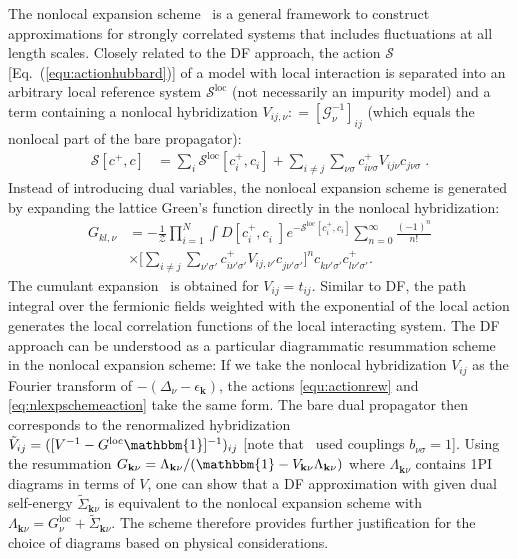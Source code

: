 \documentclass[rmp,aps,reprint,amsmath,amssymb,superscriptaddress,showpacs,nofootinbib]{revtex4-1}
\newcommand\Let{\mathrel{\mathop:\!\!=}}
\newcommand{\gr}[1] {\textcolor{green}{GR: #1}}
\begin{document}
The nonlocal expansion scheme~\cite{Li2015}  is a general framework to construct approximations for strongly correlated systems that includes fluctuations at all length scales. Closely related to the DF approach, the action $\mathcal{S}$ [Eq.~(\ref{equ:actionhubbard})] of a model with local interaction  is separated into an arbitrary local reference system $\mathcal{S}^{\text{loc}}$ (not necessarily an impurity model) and a term containing a nonlocal hybridization $V_{ij,\nu}\Let [\mathcal{G}^{-1}_{\nu}]_{ij}$ (which equals the nonlocal part of the bare propagator):
\begin{align}
  \mathcal{S}[c^{+},c]
  &= \sum_{i}\mathcal{S}^{\text{loc}}[c^{+}_{i},c_{i}]+\sum_{i\neq j}\sum_{\nu\sigma}c_{i\nu\sigma}^{+}V_{ij\nu}c_{j\nu\sigma}
  \label{eq:nlexpschemeaction} \; .
\end{align}
Instead of introducing dual variables, the nonlocal expansion scheme is generated by expanding the lattice Green's function directly in the nonlocal hybridization:
\begin{align}
  G_{kl,\nu}&=-\frac{1}{\mathcal{Z}}\prod_{i=1}^{N}\int D[c_{i}^{+},c^{\phantom +}_{i}]e^{-\mathcal{S}^{\text{loc}}[c_{i}^{+},c_{i}]} \sum_{n=0}^{\infty}\frac{(-1)^{n}}{n!}\nonumber \\ &\times\Big[\sum_{i\neq j}\sum_{\nu'\sigma'}c_{i\nu'\sigma'}^{+}V_{ij,\nu'}c^{\phantom +}_{j\nu'\sigma'}\Big]^n c_{k\nu'\sigma'}^{\phantom +}c_{l\nu'\sigma'}^{+}.
\end{align}
The cumulant expansion~\cite{Sarker1988,Metzner1991} is obtained for $V_{ij}=t_{ij}$. Similar to DF, the path integral over the fermionic fields weighted with the exponential of the local action generates the local correlation functions of the local interacting system. The DF approach can be understood as a particular diagrammatic resummation scheme in the nonlocal expansion scheme: If we take the nonlocal hybridization  $V_{ij}$ as the  Fourier transform of $-(\Delta_{\nu}-\epsilon_{\mathbf{k}})$, the actions \eqref{equ:actionrew} and \eqref{eq:nlexpschemeaction} take the same form. The bare dual propagator then corresponds to the renormalized hybridization $\tilde{V}_{ij}=([V^{-1}-G^{\text{loc}}\mathbbm{1}]^{-1})_{ij}$ [note that~ used couplings $b_{\nu\sigma}=1$]. Using the resummation $G_{\mathbf{k}\nu}=\Lambda_{\mathbf{k}\nu}/(\mathbbm{1}-V_{\mathbf{k}\nu}\Lambda_{\mathbf{k}\nu})$ where $\Lambda_{\mathbf{k}\nu}$ contains 1PI diagrams in terms of $V$, one can show that a DF approximation with given dual self-energy $\tilde{\Sigma}_{\mathbf{k}\nu}$ is equivalent to the nonlocal expansion scheme with $\Lambda_{\mathbf{k}\nu}=G^\text{loc}_\nu+\tilde{\Sigma}_{\mathbf{k}\nu}$. The scheme therefore provides further justification for the choice of diagrams based on physical considerations. %
\end{document}
